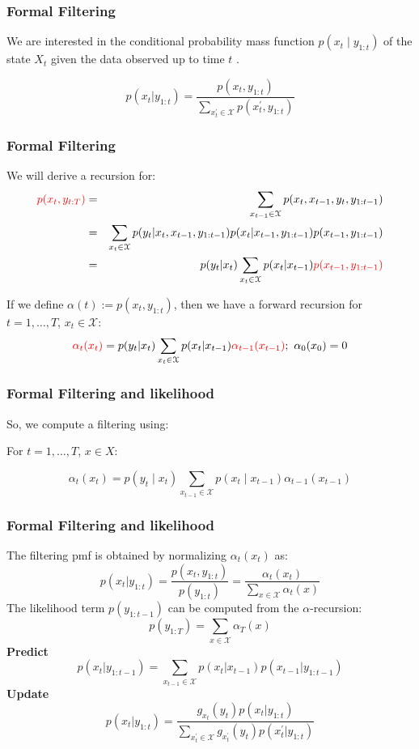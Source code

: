 \documentclass[xcolor=dvipsnames, compress]{beamer}
\begin{document}
\begin{frame}
\frametitle{Formal Filtering}
We are interested in the conditional probability mass function $p\left(x_{t}\mid y_{1:t}\right)$ of the state $X_{t}$ given the data observed up to time $t$ .

$$ p(x_t|y_{1:t}) = \frac{p(x_t, y_{1:t})}{ \sum_{x_t^\prime \in \mathcal{X}} p(x_t^\prime, y_{1:t}) }$$

\end{frame}

\begin{frame}
\frametitle{Formal Filtering}
We will derive a recursion for:
\hspace{-0.2cm}
\begin{eqnarray*}
\textcolor{red}{p(x_t,y_{t	:T})} & = & \sum_{x_{t-1} \in \mathcal{X}} p(x_t, x_{t-1}, y_t, y_{1:t-1})\\
& = & \sum_{x_t \in \mathcal{X}} p(y_{t}| x_t, x_{t-1}, y_{1:t-1} ) p(x_{t} |x_{t-1},y_{1:t-1}) p(x_{t-1},y_{1:t-1}) \\
& = &  p(y_{t}|x_t) \sum_{x_t \in \mathcal{X}} p(x_{t}|x_{t-1}) \textcolor{red}{ p(x_{t-1},y_{1:t-1})}   
\end{eqnarray*}

If we define $\alpha(t):= p(x_{t},y_{1:t})$, then we have a forward recursion for $t=1, \ldots, T$, $x_t\in \mathcal{X}$:
$$ \textcolor{red}{\alpha_{t}(x_{t})} = p(y_{t}|x_t) \sum_{x_t \in \mathcal{X}} p(x_{t}|x_{t-1}) \textcolor{red}{\alpha_{t-1}(x_{t-1})}; \mbox{ } \alpha_0(x_0)=0 $$
\end{frame}

\begin{frame}
\frametitle{Formal Filtering and likelihood}
So, we compute a filtering using: 

For $t=1,\ldots,T$, $x\in X$:

\[
\alpha_{t}\left(x_{t}\right)=p\left(y_{t}\mid x_{t}\right)\sum_{x_{t-1}\in\mathcal{{X}}}p\left(x_{t}\mid x_{t-1}\right)\alpha_{t-1}\left(x_{t-1}\right)
\]	
\end{frame}

\begin{frame}
\frametitle{Formal Filtering and likelihood}

The filtering pmf is obtained by normalizing $\alpha_{t}\left(x_{t}\right)$
as: 
$$p(x_t| y_{1:t}) = \frac{p(x_t, y_{1:t})}{p(y_{1:t})}  = \frac{\alpha_t(x_t)}{ \sum_{x \in \mathcal{X}} \alpha_t(x) }$$
The likelihood term $p\left(y_{1:t-1}\right)$ can be computed from
the $\alpha$-recursion:
$$p(y_{1:T}) =  \sum_{x \in \mathcal{X}} \alpha_T(x) $$
\textbf{Predict}
$$p(x_t| y_{1:t-1}) = \sum_{x_{t-1} \in \mathcal{X}} p(x_t|x_{t-1}) p(x_{t-1}|y_{1:t-1}) $$
\textbf{Update}
$$p(x_t| y_{1:t}) = \frac{g_{x_t}(y_t) p(x_t|y_{1:t})}{\sum_{x_{t}^\prime \in \mathcal{X}} g_{x_t^\prime}(y_t) p(x_t^\prime|y_{1:t})} $$
\end{frame}
\end{document}
